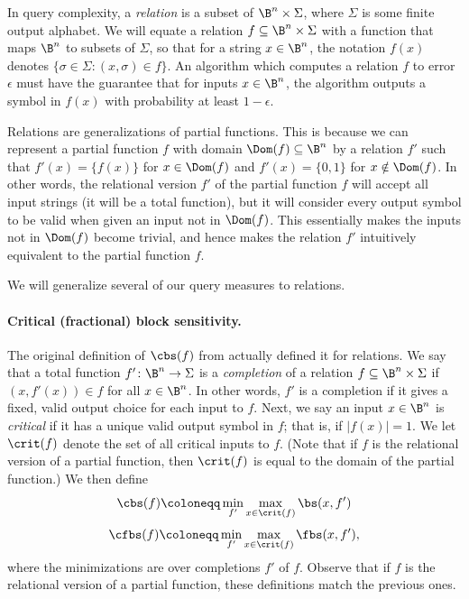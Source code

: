In query complexity, a \emph{relation} is a subset
of $\B^n\times \Sigma$, where $\Sigma$ is some finite
output alphabet. We will equate a relation
$f\subseteq \B^n\times\Sigma$ with a function
that maps $\B^n$ to subsets of $\Sigma$, so that
for a string $x\in\B^n$, the notation $f(x)$ denotes
$\{\sigma\in\Sigma:(x,\sigma)\in f\}$.
An algorithm which computes a relation $f$ to error
$\epsilon$ must have the guarantee that for inputs $x\in\B^n$,
the algorithm outputs a symbol in $f(x)$ with probability
at least $1-\epsilon$.

Relations are generalizations of partial functions.
This is because we can represent a partial function
$f$ with domain $\Dom(f)\subseteq\B^n$ by a relation
$f'$ such that $f'(x)=\{f(x)\}$ for $x\in\Dom(f)$
and $f'(x)=\{0,1\}$ for $x\notin\Dom(f)$. In other words,
the relational version $f'$ of the partial function $f$
will accept all input strings (it will be a total function),
but it will consider every output symbol to be valid
when given an input not in $\Dom(f)$. This essentially
makes the inputs not in $\Dom(f)$ become trivial, and hence
makes the relation $f'$ intuitively equivalent to the partial
function $f$.

We will generalize several of our query measures to relations.

\paragraph{Critical (fractional) block sensitivity.}
The original definition of $\cbs(f)$ from \cite{HN12} actually
defined it for relations.
We say that a total function $f'\colon\B^n\to\Sigma$
is a \emph{completion} of a relation $f\subseteq \B^n\times\Sigma$
if $(x,f'(x))\in f$ for all $x\in\B^n$. In other words,
$f'$ is a completion if it gives a fixed, valid
output choice for each input to $f$. Next, we say an input
$x\in\B^n$ is \emph{critical} if it has a unique valid
output symbol in $f$; that is, if $|f(x)|=1$.
We let $\crit(f)$ denote the set of all critical inputs
to $f$.
(Note that if $f$ is the relational version of a partial function,
then $\crit(f)$ is equal to the domain of the partial function.)
We then define
\[\cbs(f)\coloneqq \min_{f'}\max_{x\in\crit(f)}\bs(x,f')\]
\[\cfbs(f)\coloneqq \min_{f'}\max_{x\in\crit(f)}\fbs(x,f'),\]
where the minimizations are over completions $f'$ of $f$.
Observe that if $f$ is the relational version
of a partial function, these definitions
match the previous ones.


